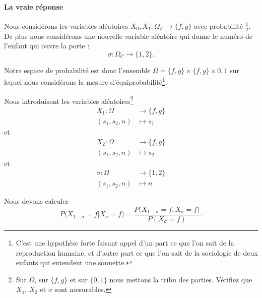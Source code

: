 \paragraph{La vraie réponse}

Nous considérons les variables aléatoires \( X_0,X_1\colon \Omega_E\to \{ f,g \}\) avec probabilité \( \frac{ 1 }{2}\). De plus nous considérons une nouvelle variable aléatoire qui donne le numéro de l'enfant qui ouvre la porte :
\begin{equation}
    \sigma\colon \Omega_C\to \{ 1,2 \}.
\end{equation}

Notre espace de probabilité est donc l'ensemble \( \Omega=\{ f,g \}\times \{ f,g \}\times {0,1}\) sur lequel nous considérons la mesure d'équiprobabilité\footnote{C'est une hypothèse forte faisant appel d'un part ce que l'on sait de la reproduction humaine, et d'autre part ce que l'on sait de la sociologie de deux enfants qui entendent une sonnette.}.

Nous introduisont les variables aléatoires\footnote{Sur \( \Omega\), sur \( \{ f,g \}\) et sur \( \{ 0,1 \}\) nous mettons la tribu des parties. Vérifiez que \( X_1\), \( X_2\) et \( \sigma\) sont mesurables.}
\begin{equation}
    \begin{aligned}
        X_1\colon \Omega&\to \{ f,g \} \\
        (s_1,s_2,n)&\mapsto s_1 
    \end{aligned}
\end{equation}
et
\begin{equation}
    \begin{aligned}
        X_2\colon \Omega&\to \{ f,g \} \\
        (s_1,s_2,n)&\mapsto s_2 
    \end{aligned}
\end{equation}
et
\begin{equation}
    \begin{aligned}
        \sigma\colon \Omega&\to \{ 1,2 \} \\
        (s_1,s_2,n)&\mapsto n
    \end{aligned}
\end{equation}


Nous devons calculer
\begin{equation}
    P\big( X_{1-\sigma}=f|X_{\sigma}=f \big)=\frac{ P\big( X_{1-\sigma}=f,X_{\sigma}=f \big) }{ P(X_{\sigma}=f) }.
\end{equation}

